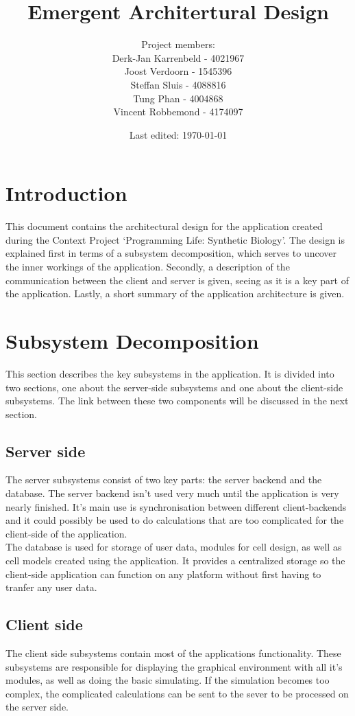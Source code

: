 \documentclass{report}
\title{Emergent Architertural Design}
\date{Last edited: \today}
\author{Project members: \\
	Derk-Jan Karrenbeld - 4021967\\
	Joost Verdoorn - 1545396\\
	Steffan Sluis - 4088816\\
	Tung Phan - 4004868\\
	Vincent Robbemond - 4174097
	}
\begin{document}
	\maketitle

	\tableofcontents

	\clearpage

	\setcounter{section}{0}
	\renewcommand*\thesection{\arabic{section}}
	
	\section*{Introduction}
		This document contains the architectural design for the application created during the Context Project `Programming Life: Synthetic Biology'. The design is explained first in terms of a subsystem decomposition, which serves to uncover the inner workings of the application. Secondly, a description of the communication between the client and server is given, seeing as it is a key part of the application. Lastly, a short summary of the application architecture is given.
	\clearpage
	\section{Subsystem Decomposition}
		This section describes the key subsystems in the application. It is divided into two sections, one about the server-side subsystems and one about the client-side subsystems. The link between these two components will be discussed in the next section.
		\subsection{Server side}
			The server subsystems consist of two key parts: the server backend and the database. The server backend isn't used very much until the application is very nearly finished. It's main use is synchronisation between different client-backends and it could possibly be used to do calculations that are too complicated for the client-side of the application.\\
			The database is used for storage of user data, modules for cell design, as well as cell models created using the application. It provides a centralized storage so the client-side application can function on any platform without first having to tranfer any user data.
		\subsection{Client side}
			The client side subsystems contain most of the applications functionality. These subsystems are responsible for displaying the graphical environment with all it's modules, as well as doing the basic simulating. If the simulation becomes too complex, the complicated calculations can be sent to the sever to be processed on the server side. 
	\clearpage
\end{document}
